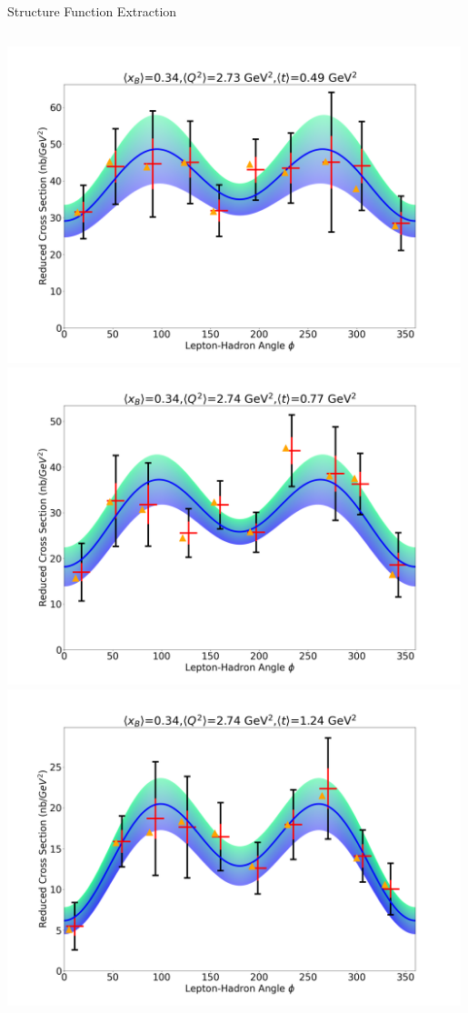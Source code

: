 \documentclass[aspectratio=169]{beamer}
\begin{document}
\begin{frame}{Structure Function Extraction}
\begin{columns}
            \includegraphics[width=0.99\textwidth]{defense/phi_fitting/xqt_302540.png}
            \includegraphics[width=0.99\textwidth]{defense/phi_fitting/xqt_302560.png}
            \includegraphics[width=0.99\textwidth]{defense/phi_fitting/xqt_3025100.png}

\end{columns}
\end{frame}
\end{document}
